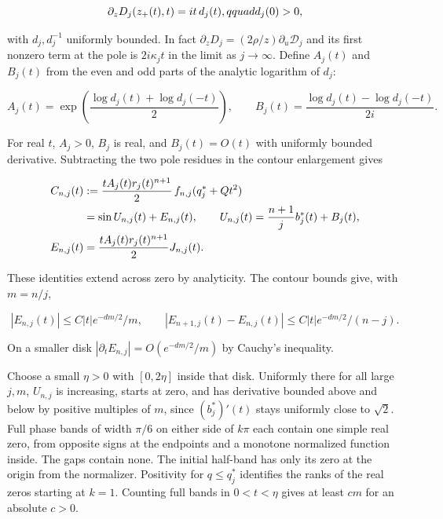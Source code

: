\documentclass[11pt]{article}
\begin{document}
\begin{equation*}
\partial_zD_j(z_+(t),t)=it\thinspace  d_j(t),qquad d_j(0)>0,
\end{equation*}

with \(d_j,d_j^{-1}\) uniformly bounded. In fact \(\partial_zD_j=(2\rho/z)\partial_u\mathcal D_j\) and its first nonzero term at the pole is \(2i\kappa_j t\) in the limit as \(j\to\infty\). Define \(A_j(t)\) and \(B_j(t)\) from the even and odd parts of the analytic logarithm of \(d_j\):

\begin{equation*}
A_j(t)=\exp\left(\frac{\log d_j(t)+\log d_j(-t)}2\right),\qquad
B_j(t)=\frac{\log d_j(t)-\log d_j(-t)}{2i}.
\end{equation*}

For real \(t\), \(A_j>0\), \(B_j\) is real, and \(B_j(t)=O(t)\) with uniformly bounded derivative. Subtracting the two pole residues in the contour enlargement gives

\begin{equation*}
\begin{aligned}
C_{n,j}(t)&:=\frac{t A_j(t)r_j(t)^{n+1}}{2}\thinspace f_{n,j}(q_j^{\ast}+Qt^2) \\
&=\sin U_{n,j}(t)+E_{n,j}(t),\qquad
U_{n,j}(t)=\frac{n+1}{j} b_j^{\ast}(t)+B_j(t),\\
E_{n,j}(t)&=\frac{t A_j(t)r_j(t)^{n+1}}2 J_{n,j}(t).
\end{aligned}
\end{equation*}

These identities extend across zero by analyticity. The contour bounds give, with \(m=n/j\),

\begin{equation*}
|E_{n,j}(t)|\le C|t|e^{-dm/2}/m,
\qquad
|E_{n+1,j}(t)-E_{n,j}(t)|\le C|t|e^{-dm/2}/(n-j).
\end{equation*}

On a smaller disk \(|\partial_t E_{n,j}|=O(e^{-dm/2}/m)\) by Cauchy's inequality.

Choose a small \(\eta>0\) with \([0,2\eta]\) inside that disk. Uniformly there for all large \(j,m\), \(U_{n,j}\) is increasing, starts at zero, and has derivative bounded above and below by positive multiples of \(m\), since \((b_j^*)'(t)\) stays uniformly close to \(\sqrt2\). Full phase bands of width \(\pi/6\) on either side of \(k\pi\) each contain one simple real zero, from opposite signs at the endpoints and a monotone normalized function inside. The gaps contain none. The initial half-band has only its zero at the origin from the normalizer. Positivity for \(q\le q_j^*\) identifies the ranks of the real zeros starting at \(k=1\). Counting full bands in \(0<t<\eta\) gives at least \(cm\) for an absolute \(c>0\).
\end{document}
